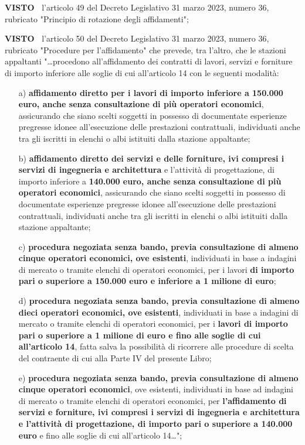 \documentclass[a4paper,12pt]{letter}
\begin{document}
\textbf{VISTO~}	l’articolo 49 del Decreto Legislativo 31 marzo 2023,
numero 36, rubricato "Principio di rotazione degli affidamenti";


\textbf{VISTO~}	l’articolo 50 del Decreto Legislativo 31 marzo 2023,
numero 36, rubricato "Procedure per l’affidamento" che prevede,
tra l’altro, che le stazioni appaltanti "…procedono all'affidamento
dei contratti di lavori, servizi e forniture di importo inferiore alle
soglie di cui all'articolo 14 con le seguenti modalità:


\begin{enumerate}

\item[a)]  \textbf{affidamento diretto per i lavori di importo inferiore a 150.000
euro, anche senza consultazione di più operatori economici}, assicurando
che siano scelti soggetti in possesso di documentate esperienze pregresse
idonee all'esecuzione delle prestazioni contrattuali, individuati anche
tra gli iscritti in elenchi o albi istituiti dalla stazione appaltante;

\item[b)]  \textbf{affidamento diretto dei servizi e delle forniture, ivi compresi
i servizi di ingegneria e architettura} e l'attività di progettazione,
di importo inferiore a \textbf{140.000 euro, anche senza consultazione di più
operatori economici}, assicurando che siano scelti soggetti in possesso di
documentate esperienze pregresse idonee all'esecuzione delle prestazioni
contrattuali, individuati anche tra gli iscritti in elenchi o albi
istituiti dalla stazione appaltante;

\item[c)] \textbf{procedura negoziata senza bando, previa consultazione di almeno
cinque operatori economici, ove esistenti}, individuati in base a indagini
di mercato o tramite elenchi di operatori economici, per i lavori \textbf{di
importo pari o superiore a 150.000 euro e inferiore a 1 milione di euro};

\item[d)] \textbf{procedura negoziata senza bando, previa consultazione di almeno
dieci operatori economici, ove esistenti}, individuati in base a indagini
di mercato o tramite elenchi di operatori economici, per i \textbf{lavori di
importo pari o superiore a 1 milione di euro e fino alle soglie di cui
all'articolo 14}, fatta salva la possibilità di ricorrere alle procedure
di scelta del contraente di cui alla Parte IV del presente Libro;

\item[e)] \textbf{procedura negoziata senza bando, previa consultazione di almeno
cinque operatori economici}, ove esistenti, individuati in base ad indagini
di mercato o tramite elenchi di operatori economici, per \textbf{l'affidamento di
servizi e forniture, ivi compresi i servizi di ingegneria e architettura
e l'attività di progettazione, di importo pari o superiore a 140.000
euro} e fino alle soglie di cui all'articolo 14…";

\end{enumerate}
\end{document}

